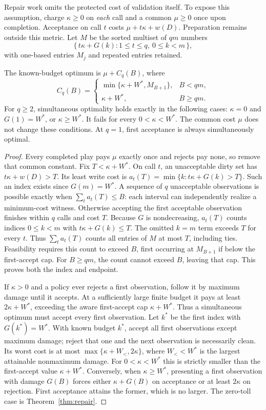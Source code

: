 Repair work omits the protected cost of validation itself. To expose this assumption, charge $\kappa\ge0$ on \emph{each} call and a common $\mu\ge0$ once upon completion. Acceptance on call $t$ costs $\mu+t\kappa+w(D)$. Preparation remains outside this metric. Let $M$ be the sorted multiset of $qm$ numbers
\[
\{\,t\kappa+G(k):1\le t\le q,\ 0\le k<m\,\},
\]
with one-based entries $M_j$ and repeated entries retained.

\begin{theorem}
\label{thm:toll}
The known-budget optimum is $\mu+C_q(B)$, where
\[
C_q(B)=\begin{cases}
\min\{\kappa+W^*,M_{B+1}\},& B<qm,\\
\kappa+W^*,&B\ge qm.
\end{cases}
\]
For $q\ge2$, simultaneous optimality holds exactly in the following cases: $\kappa=0$ and $G(1)=W^*$, or $\kappa\ge W^*$. It fails for every $0<\kappa<W^*$. The common cost $\mu$ does not change these conditions. At $q=1$, first acceptance is always simultaneously optimal.
\end{theorem}
\begin{proof}
Every completed play pays $\mu$ exactly once and rejects pay none, so remove that common constant. Fix $T<\kappa+W^*$. On call $t$, an unacceptable dirty set has $t\kappa+w(D)>T$. Its least write cost is
$a_t(T)=\min\{k:t\kappa+G(k)>T\}$. Such an index exists since $G(m)=W^*$. A sequence of $q$ unacceptable observations is possible exactly when $\sum_ta_t(T)\le B$: each interval can independently realize a minimum-cost witness. Otherwise accepting the first acceptable observation finishes within $q$ calls and cost $T$. Because $G$ is nondecreasing, $a_t(T)$ counts indices $0\le k<m$ with $t\kappa+G(k)\le T$. The omitted $k=m$ term exceeds $T$ for every $t$. Thus $\sum_ta_t(T)$ counts all entries of $M$ at most $T$, including ties. Feasibility requires this count to exceed $B$, first occurring at $M_{B+1}$ if below the first-accept cap. For $B\ge qm$, the count cannot exceed $B$, leaving that cap. This proves both the index and endpoint.

If $\kappa>0$ and a policy ever rejects a first observation, follow it by maximum damage until it accepts. At a sufficiently large finite budget it pays at least $2\kappa+W^*$, exceeding the aware first-accept cap $\kappa+W^*$. Thus a simultaneous optimum must accept every first observation. Let $k^*$ be the first index with $G(k^*)=W^*$. With known budget $k^*$, accept all first observations except maximum damage; reject that one and the next observation is necessarily clean. Its worst cost is at most $\max\{\kappa+W_{<},2\kappa\}$, where $W_{<}<W^*$ is the largest attainable nonmaximum damage. For $0<\kappa<W^*$ this is strictly smaller than the first-accept value $\kappa+W^*$. Conversely, when $\kappa\ge W^*$, presenting a first observation with damage $G(B)$ forces either $\kappa+G(B)$ on acceptance or at least $2\kappa$ on rejection. First acceptance attains the former, which is no larger. The zero-toll case is Theorem~\ref{thm:repair}.
\end{proof}

